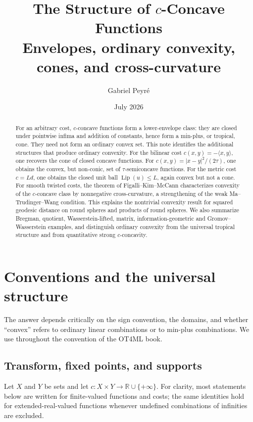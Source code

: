 \documentclass[11pt,a4paper]{article}
\title{The Structure of $c$-Concave Functions\\
  \large Envelopes, ordinary convexity, cones, and cross-curvature}
\author{Gabriel Peyr\'e}
\date{July 2026}
\theoremstyle{definition}
\theoremstyle{remark}
\newcommand{\R}{\mathbb R}
\begin{document}
\maketitle

\begin{abstract}
For an arbitrary cost, $c$-concave functions form a lower-envelope class: they
are closed under pointwise infima and addition of constants, hence form a
min-plus, or tropical, cone. They need not form an ordinary convex set. This
note identifies the additional structures that produce ordinary convexity.
For the bilinear cost $c(x,y)=-\langle x,y\rangle$, one recovers the cone of
closed concave functions. For $c(x,y)=\lvert x-y\rvert^2/(2\tau)$, one obtains
the convex, but non-conic, set of $\tau$-semiconcave functions. For the metric
cost $c=Ld$, one obtains the closed unit ball $\operatorname{Lip}(u)\leq L$,
again convex but not a cone. For smooth twisted costs, the theorem of
Figalli--Kim--McCann characterizes convexity of the $c$-concave class by
nonnegative cross-curvature, a strengthening of the weak Ma--Trudinger--Wang
condition. This explains the nontrivial convexity result for squared geodesic
distance on round spheres and products of round spheres. We also summarize
Bregman, quotient, Wasserstein-lifted, matrix, information-geometric and
Gromov--Wasserstein examples, and distinguish ordinary convexity from the
universal tropical structure and from quantitative strong $c$-concavity.
\end{abstract}

\section{Conventions and the universal structure}

The answer depends critically on the sign convention, the domains, and whether
``convex'' refers to ordinary linear combinations or to min-plus combinations.
We use throughout the convention of the OT4ML book.

\subsection{Transform, fixed points, and supports}

Let $X$ and $Y$ be sets and let
$c:X\times Y\to\R\cup\{+\infty\}$. For clarity, most statements below are
written for finite-valued functions and costs; the same identities hold for
extended-real-valued functions whenever undefined combinations of infinities
are excluded.
\end{document}
